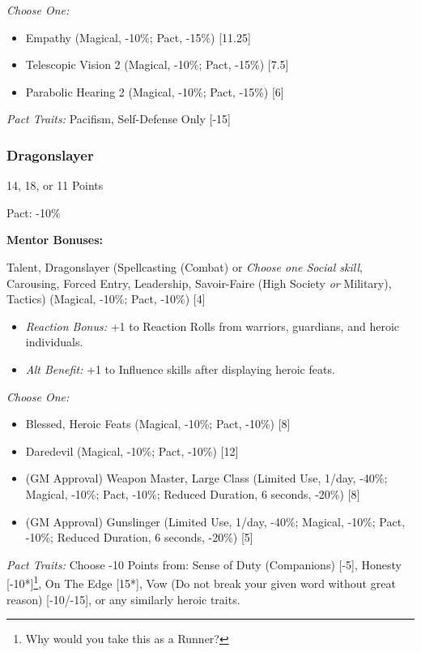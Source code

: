 \begin{multicols}{3}
	\textit{Choose One:}
	\begin{itemize}
		\itemsep 0pt
		\item Empathy (Magical, -10\%; Pact, -15\%) [11.25]
		\item Telescopic Vision 2 (Magical, -10\%; Pact, -15\%) [7.5]
		\item Parabolic Hearing 2 (Magical, -10\%; Pact, -15\%) [6]
	\end{itemize}
	
	\textit{Pact Traits:} Pacifism, Self-Defense Only [-15]
	
	\subsubsection{Dragonslayer}
	\begin{flushright}
		14, 18, or 11 Points
	\end{flushright}
	Pact: -10\%
	
	
	\textbf{Mentor Bonuses:} 
	
	Talent, Dragonslayer (Spellcasting (Combat) or \textit{Choose one Social skill}, Carousing, Forced Entry, Leadership, Savoir-Faire (High Society \textit{or} Military), Tactics) (Magical, -10\%; Pact, -10\%) [4]
	\begin{itemize}
		\itemsep 0pt
		\item \textit{Reaction Bonus:} +1 to Reaction Rolls from warriors, guardians, and heroic individuals.
		\item \textit{Alt Benefit:} +1 to Influence skills after displaying heroic feats.
	\end{itemize}
	
	\textit{Choose One:}
	\begin{itemize}
		\itemsep 0pt
		\item Blessed, Heroic Feats (Magical, -10\%; Pact, -10\%) [8]
		\item Daredevil (Magical, -10\%; Pact, -10\%) [12]
		\item (GM Approval) Weapon Master, Large Class (Limited Use, 1/day, -40\%; Magical, -10\%; Pact, -10\%; Reduced Duration, 6 seconds, -20\%) [8]
		\item (GM Approval) Gunslinger (Limited Use, 1/day, -40\%; Magical, -10\%; Pact, -10\%; Reduced Duration, 6 seconds, -20\%) [5]
	\end{itemize}
	
	\textit{Pact Traits:} Choose -10 Points from: Sense of Duty (Companions) [-5], Honesty [-10*]\footnote{Why would you take this as a Runner?}, On The Edge [15*], Vow (Do not break your given word without great reason) [-10/-15], or any similarly heroic traits.
	

\end{multicols}
